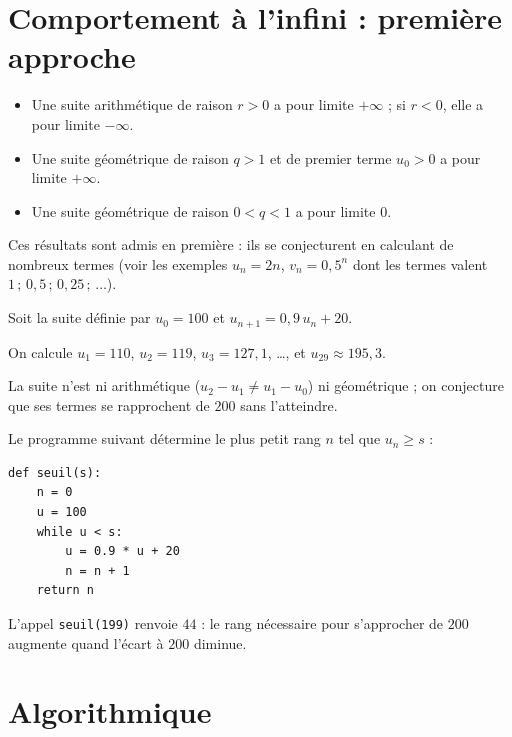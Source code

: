 \documentclass{poly}
\begin{document}
\section{Comportement à l'infini : première approche}

\begin{propriete}
	\begin{itemize}
		\item Une suite arithmétique de raison $r > 0$ a pour limite $+\infty$ ; si $r < 0$, elle a pour limite $-\infty$.
		\item Une suite géométrique de raison $q > 1$ et de premier terme $u_0 > 0$ a pour limite $+\infty$.
		\item Une suite géométrique de raison $0 < q < 1$ a pour limite $0$.
	\end{itemize}
\end{propriete}

\begin{rem}
	Ces résultats sont admis en première : ils se conjecturent en calculant de nombreux termes (voir les exemples $u_n = 2n$, $v_n = 0{,}5^n$ dont les termes valent $1\,;\,0{,}5\,;\,0{,}25\,;\,\dots$).
\end{rem}

\begin{ex}
	Soit la suite définie par $u_0 = 100$ et $u_{n+1} = 0{,}9\,u_n + 20$.

	On calcule $u_1 = 110$, $u_2 = 119$, $u_3 = 127{,}1$, \dots, et $u_{29} \approx 195{,}3$.

	La suite n'est ni arithmétique ($u_2 - u_1 \neq u_1 - u_0$) ni géométrique ; on conjecture que ses termes se rapprochent de $200$ sans l'atteindre.

	Le programme suivant détermine le plus petit rang $n$ tel que $u_n \geq s$ :

	\begin{lstlisting}
def seuil(s):
    n = 0
    u = 100
    while u < s:
        u = 0.9 * u + 20
        n = n + 1
    return n
\end{lstlisting}

	L'appel \texttt{seuil(199)} renvoie $44$ : le rang nécessaire pour s'approcher de $200$ augmente quand l'écart à $200$ diminue.
\end{ex}

\section{Algorithmique}
\end{document}
